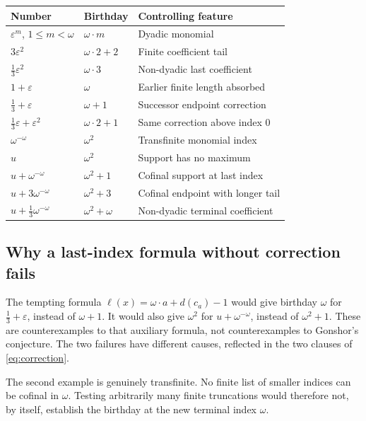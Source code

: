 \documentclass[11pt,letterpaper]{article}
\theoremstyle{definition}
\theoremstyle{remark}
\newcommand{\bd}{\ell}
\newcommand{\ep}{\varepsilon}
\begin{document}
\begin{center}
\renewcommand{\arraystretch}{1.28}
\begin{tabular}{@{}>{\raggedright\arraybackslash}p{}>{\raggedright\arraybackslash}p{}>{\raggedright\arraybackslash}p{}@{}}
\toprule
\textbf{Number} & \textbf{Birthday} & \textbf{Controlling feature}\\
\midrule
\(\ep^m\), \(1\leq m<\omega\) & \(\omega\cdot m\) & Dyadic monomial\\
\(3\ep^2\) & \(\omega\cdot2+2\) & Finite coefficient tail\\
\(\tfrac13\ep^2\) & \(\omega\cdot3\) & Non-dyadic last coefficient\\
\(1+\ep\) & \(\omega\) & Earlier finite length absorbed\\
\(\tfrac13+\ep\) & \(\omega+1\) & Successor endpoint correction\\
\(\tfrac13\ep+\ep^2\) & \(\omega\cdot2+1\) & Same correction above index 0\\
\(\omega^{-\omega}\) & \(\omega^2\) & Transfinite monomial index\\
\(u\) & \(\omega^2\) & Support has no maximum\\
\(u+\omega^{-\omega}\) & \(\omega^2+1\) & Cofinal support at last index\\
\(u+3\omega^{-\omega}\) & \(\omega^2+3\) & Cofinal endpoint with longer tail\\
\(u+\tfrac13\omega^{-\omega}\) & \(\omega^2+\omega\) & Non-dyadic terminal coefficient\\
\bottomrule
\end{tabular}
\end{center}

\subsection{Why a last-index formula without correction fails}
The tempting formula
\(\bd(x)=\omega\cdot a+d(c_a)-1\) would give birthday \(\omega\)
for \(\frac13+\ep\), instead of \(\omega+1\). It would also give
\(\omega^2\) for \(u+\omega^{-\omega}\), instead of \(\omega^2+1\).
These are counterexamples to that auxiliary formula, not counterexamples
to Gonshor's conjecture. The two failures have different causes, reflected
in the two clauses of \eqref{eq:correction}.

The second example is genuinely transfinite. No finite list of smaller
indices can be cofinal in \(\omega\). Testing arbitrarily many finite
truncations would therefore not, by itself, establish the birthday at the
new terminal index \(\omega\).
\end{document}

